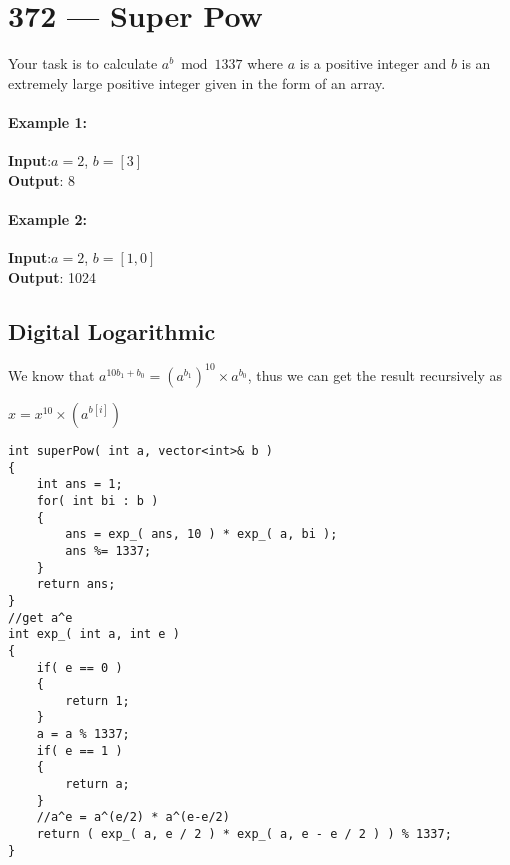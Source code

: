 \section{372 --- Super Pow}
Your task is to calculate $ a^b \bmod 1337$ where $ a $ is a positive integer and $ b $ is an extremely large positive integer given in the form of an array.

\paragraph{Example 1:}

\begin{flushleft}
\textbf{Input}:$  a = 2 $, $ b = [3] $
\\
\textbf{Output}: 8
\end{flushleft}

\paragraph{Example 2:}

\begin{flushleft}
\textbf{Input}:$  a = 2 $, $ b = [1,0] $
\\
\textbf{Output}: 1024
\end{flushleft}

\subsection{Digital Logarithmic}
We know that $a^{10b_1+b_0} = (a^{b_1})^{10} \times a^{b_0}$, thus we can get the result recursively as

$x = x^{10} \times (a^{b[i]})$

\setcounter{lstlisting}{0}
\begin{lstlisting}[style=customc, caption={Digital Modular}]
int superPow( int a, vector<int>& b )
{
    int ans = 1;
    for( int bi : b )
    {
        ans = exp_( ans, 10 ) * exp_( a, bi );
        ans %= 1337;
    }
    return ans;
}
//get a^e
int exp_( int a, int e )
{
    if( e == 0 )
    {
        return 1;
    }
    a = a % 1337;
    if( e == 1 )
    {
        return a;
    }
    //a^e = a^(e/2) * a^(e-e/2)
    return ( exp_( a, e / 2 ) * exp_( a, e - e / 2 ) ) % 1337;
}
\end{lstlisting}
